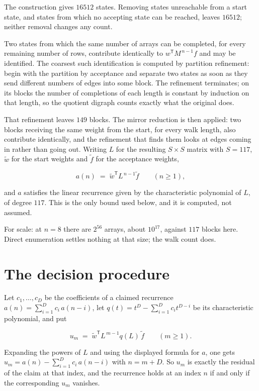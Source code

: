 \documentclass[11pt]{article}
\theoremstyle{definition}
\begin{document}
The construction gives $16512$ states. Removing states unreachable from a start state, and states from which no accepting state can be reached, leaves $16512$; neither removal changes any count.

Two states from which the same number of arrays can be completed, for every remaining number of rows, contribute identically to $w^{\mathsf T}M^{\,n-1}f$ and may be identified. The coarsest such identification is computed by partition refinement: begin with the partition by acceptance and separate two states as soon as they send different numbers of edges into some block. The refinement terminates; on its blocks the number of completions of each length is constant by induction on that length, so the quotient digraph counts exactly what the original does.

That refinement leaves $149$ blocks. The mirror reduction is then applied: two blocks receiving the same weight from the start, for every walk length, also contribute identically, and the refinement that finds them looks at edges coming in rather than going out. Writing $L$ for the resulting $S \times S$ matrix with $S = 117$, $\tilde w$ for the start weights and $\tilde f$ for the acceptance weights,

\[a(n) \;=\; \tilde w^{\mathsf T} L^{\,n-1} \tilde f \qquad (n \ge 1),\]

and $a$ satisfies the linear recurrence given by the characteristic polynomial of $L$, of degree $117$. This is the only bound used below, and it is computed, not assumed.

For scale: at $n = 8$ there are $2^{56}$ arrays, about $10^{17}$, against $117$ blocks here. Direct enumeration settles nothing at that size; the walk count does.

\section{The decision procedure}

Let $c_1,\dots,c_D$ be the coefficients of a claimed recurrence $a(n) = \sum_{i=1}^{D} c_i\,a(n-i)$, let $q(t) = t^{D} - \sum_{i=1}^{D} c_i t^{D-i}$ be its characteristic polynomial, and put

\[u_m \;=\; \tilde w^{\mathsf T} L^{\,m-1} q(L)\,\tilde f \qquad (m \ge 1).\]

Expanding the powers of $L$ and using the displayed formula for $a$, one gets $u_m = a(n) - \sum_{i=1}^{D} c_i\,a(n-i)$ with $n = m + D$. So $u_m$ is exactly the residual of the claim at that index, and the recurrence holds at an index $n$ if and only if the corresponding $u_m$ vanishes.
\end{document}
